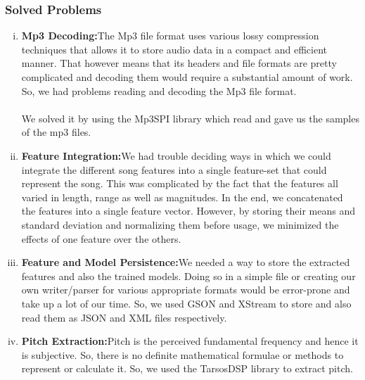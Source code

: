 \subsubsection{Solved Problems}
\begin{enumerate}[(i)]
        \item \textbf{Mp3 Decoding:}The Mp3 file format uses various lossy compression techniques that allows it to store audio data in a compact and efficient manner. That however means that its headers and file formats are pretty complicated and decoding them would require a substantial amount of work. So, we had problems reading and decoding the Mp3 file format.\\ 
                \\
                We solved it by using the Mp3SPI library which read and gave us the samples of the mp3 files.
        \item \textbf{Feature Integration:}We had trouble deciding ways in which we could integrate the different song features into a single feature-set that could represent the song. This was complicated by the fact that the features all varied in length, range as well as magnitudes. 
                In the end, we concatenated the features into a single feature vector. However, by storing their means and standard deviation and normalizing them before usage, we minimized the effects of one feature over the others. 
        \item \textbf{Feature and Model Persistence:}We needed a way to store the extracted features and also the trained models. Doing so in a simple file or creating our own writer/parser for various appropriate formats would be error-prone and take up a lot of our time. 
                So, we used GSON and XStream to store and also read them as JSON and XML files respectively. 
        \item \textbf{Pitch Extraction:}Pitch is the perceived fundamental frequency and hence it is subjective. So, there is no definite mathematical formulae or methods to represent or calculate it. 
                So, we used the TarsosDSP library to extract pitch. 
\end{enumerate}


